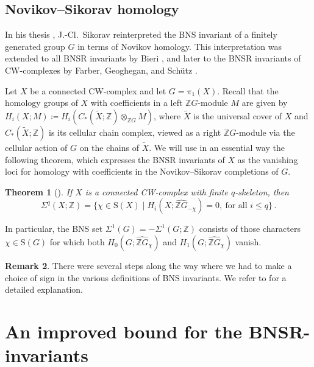 \documentclass[11pt]{amsart}
\newtheorem{theorem}{Theorem}[section]
\theoremstyle{definition}
\newtheorem{remark}[theorem]{Remark}
\newcommand{\Z}{\mathbb{Z}}
\newcommand{\rS}{\mathrm{S}}
\begin{document}
\subsection{Novikov--Sikorav homology}
\label{subsec:novikov-sikorav}
In his thesis \cite{Sk87}, J.-Cl.~Sikorav reinterpreted the BNS invariant 
of a finitely generated group $G$ in terms of Novikov homology. 
This interpretation was extended to all BNSR invariants 
by Bieri \cite{Bi07}, and later to the BNSR invariants of 
CW-complexes by Farber, Geoghegan, and Sch\"{u}tz \cite{FGS}. 

Let $X$ be a connected CW-complex and let $G=\pi_1(X)$. 
Recall that the homology groups of $X$ with coefficients in a left 
$\Z{G}$-module $M$ are given by 
$H_{i}(X;M)\coloneqq H_i( C_*(\widetilde{X};\Z)\otimes_{\Z{G}} M )$, 
where $\widetilde{X}$ is the universal cover of $X$ and $C_*(\widetilde{X};\Z)$ 
is its cellular chain complex, viewed as a right $\Z{G}$-module via the 
cellular action of $G$ on the chains of $\widetilde{X}$. 
We will use in an essential way the following theorem, which expresses the 
BNSR invariants of $X$ as the vanishing loci for homology with 
coefficients in the Novikov--Sikorav completions of $G$.  

\begin{theorem}[\cite{FGS}]
\label{thm:bns novikov}
If $X$ is a connected CW-complex with finite $q$-skeleton, then    
\begin{equation}
\label{eq:bnsr fgs}
\Sigma^{q}(X; \Z)= \big\{ \chi \in \rS(X) \mid
H_{i}(X; \widehat{\Z{G}}_{-\chi})=0,\: \text{for all $i\le q$} \big\}\, .
\end{equation}
\end{theorem}

In particular, the BNS set $\Sigma^1(G)=-\Sigma^1(G;\Z)$ consists 
of those characters $\chi \in \rS(G)$ for which both $H_{0}(G; \widehat{\Z{G}}_{\chi})$ 
and $H_{1}(G; \widehat{\Z{G}}_{\chi})$ vanish.

\begin{remark}
\label{rem:signs}
There were several steps along the way where we had to make a choice 
of sign in the various definitions of BNS invariants. We refer 
to \cite[Remark 5.7]{Su-mathann} for a detailed explanation.
\end{remark}

\section{An improved bound for the BNSR-invariants}
\label{sect:twist-bound}
\end{document}
